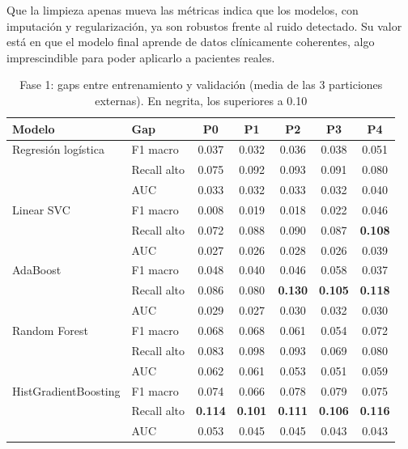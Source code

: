 \documentclass[journal,onecolumn]{IEEEtran}
\begin{document}
Que la limpieza apenas mueva las métricas indica que los modelos, con imputación y regularización, ya son robustos frente al ruido detectado. Su valor está en que el modelo final aprende de datos clínicamente coherentes, algo imprescindible para poder aplicarlo a pacientes reales.

\begin{table}[H]
\caption{Fase 1: gaps entre entrenamiento y validación (media de las 3 particiones externas). En negrita, los superiores a 0.10}
\label{tab:gaps1}
\centering
\footnotesize
\renewcommand{\arraystretch}{0.9}
\begin{tabular}{|l|l|c|c|c|c|c|}
\hline
\textbf{Modelo} & \textbf{Gap} & \textbf{P0} & \textbf{P1} & \textbf{P2} & \textbf{P3} & \textbf{P4} \\
\hline
Regresión logística & F1 macro & 0{.}037 & 0{.}032 & 0{.}036 & 0{.}038 & 0{.}051 \\
 & Recall alto & 0{.}075 & 0{.}092 & 0{.}093 & 0{.}091 & 0{.}080 \\
 & AUC & 0{.}033 & 0{.}032 & 0{.}033 & 0{.}032 & 0{.}040 \\
\hline
Linear SVC & F1 macro & 0{.}008 & 0{.}019 & 0{.}018 & 0{.}022 & 0{.}046 \\
 & Recall alto & 0{.}072 & 0{.}088 & 0{.}090 & 0{.}087 & \textbf{0{.}108} \\
 & AUC & 0{.}027 & 0{.}026 & 0{.}028 & 0{.}026 & 0{.}039 \\
\hline
AdaBoost & F1 macro & 0{.}048 & 0{.}040 & 0{.}046 & 0{.}058 & 0{.}037 \\
 & Recall alto & 0{.}086 & 0{.}080 & \textbf{0{.}130} & \textbf{0{.}105} & \textbf{0{.}118} \\
 & AUC & 0{.}029 & 0{.}027 & 0{.}030 & 0{.}032 & 0{.}030 \\
\hline
Random Forest & F1 macro & 0{.}068 & 0{.}068 & 0{.}061 & 0{.}054 & 0{.}072 \\
 & Recall alto & 0{.}083 & 0{.}098 & 0{.}093 & 0{.}069 & 0{.}080 \\
 & AUC & 0{.}062 & 0{.}061 & 0{.}053 & 0{.}051 & 0{.}059 \\
\hline
HistGradientBoosting & F1 macro & 0{.}074 & 0{.}066 & 0{.}078 & 0{.}079 & 0{.}075 \\
 & Recall alto & \textbf{0{.}114} & \textbf{0{.}101} & \textbf{0{.}111} & \textbf{0{.}106} & \textbf{0{.}116} \\
 & AUC & 0{.}053 & 0{.}045 & 0{.}045 & 0{.}043 & 0{.}043 \\
\hline
\end{tabular}
\end{table}
\end{document}
